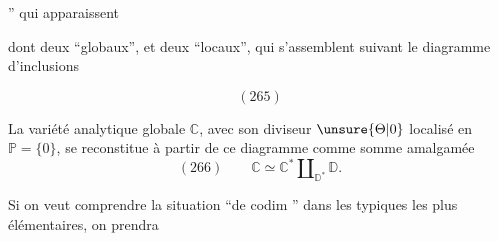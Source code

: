 '' qui apparaissent


dont deux ``globaux'', et deux ``locaux'', qui s'assemblent suivant le diagramme d'inclusions

\[
(265)
\]

La variété analytique globale $\mathbb C$, avec son diviseur $\unsure{\Theta|0}$ localisé en $\mathbb P=\{0\}$, se reconstitue à partir de ce diagramme comme somme amalgamée
\[
(266)\qquad \mathbb C\simeq \mathbb C^*\amalg_{\mathbb D^*}\mathbb D.
\]

Si on veut comprendre la situation ``de codim '' dans les  typiques les plus élémentaires, on prendra
